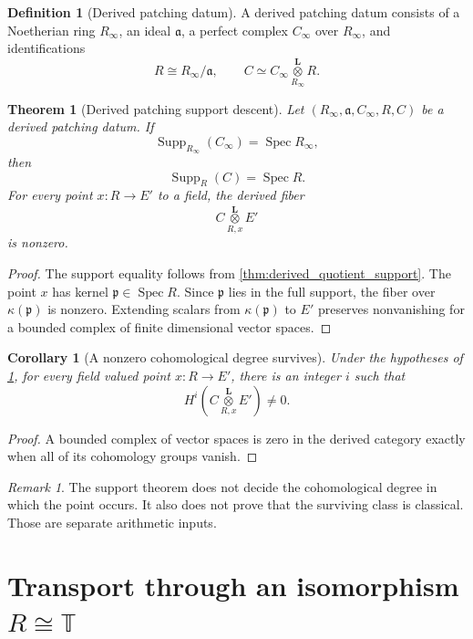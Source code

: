 \documentclass{aomart}
\newtheorem{theorem}{Theorem}[section]
\newtheorem{corollary}[corollary]{Corollary}
\theoremstyle{definition}
\newtheorem{definition}[definition]{Definition}
\theoremstyle{remark}
\newtheorem{remark}[remark]{Remark}
\newcommand{\TT}{\mathbb T}
\newcommand{\Spec}{\operatorname{Spec}}
\newcommand{\Supp}{\operatorname{Supp}}
\newcommand{\frakp}{\mathfrak p}
\newcommand{\fraka}{\mathfrak a}
\begin{document}
\begin{definition}[Derived patching datum]\label{def:derived_patching_datum}
A derived patching datum consists of a Noetherian ring \(R_\infty\), an ideal
\(\fraka\), a perfect complex \(C_\infty\) over \(R_\infty\), and identifications
\[
R\cong R_\infty/\fraka,
\qquad
C\simeq
C_\infty
\mathbin{\mathop{\otimes}\limits_{R_\infty}^{\mathbf L}}R.
\]
\end{definition}

\begin{theorem}[Derived patching support descent]\label{thm:derived_support_descent}
Let \((R_\infty,\fraka,C_\infty,R,C)\) be a derived patching datum. If
\[
\Supp_{R_\infty}(C_\infty)=\Spec R_\infty,
\]
then
\[
\boxed{
\Supp_R(C)=\Spec R.
}
\]
For every point \(x:R\to E'\) to a field, the derived fiber
\[
C\mathbin{\mathop{\otimes}\limits_{R,x}^{\mathbf L}}E'
\]
is nonzero.
\end{theorem}

\begin{proof}
The support equality follows from \cref{thm:derived_quotient_support}. The point
\(x\) has kernel \(\frakp\in\Spec R\). Since \(\frakp\) lies in the full support, the fiber over \(\kappa(\frakp)\) is nonzero. Extending scalars from \(\kappa(\frakp)\) to \(E'\) preserves nonvanishing for a bounded complex of finite dimensional vector spaces.
\end{proof}

\begin{corollary}[A nonzero cohomological degree survives]\label{cor:derived_degree_survives}
Under the hypotheses of \cref{thm:derived_support_descent}, for every field valued point \(x:R\to E'\), there is an integer \(i\) such that
\[
H^i
\left(
C\mathbin{\mathop{\otimes}\limits_{R,x}^{\mathbf L}}E'
\right)
\neq0.
\]
\end{corollary}

\begin{proof}
A bounded complex of vector spaces is zero in the derived category exactly when all of its cohomology groups vanish.
\end{proof}

\begin{remark}
The support theorem does not decide the cohomological degree in which the point occurs. It also does not prove that the surviving class is classical. Those are separate arithmetic inputs.
\end{remark}

\section{Transport through an isomorphism \texorpdfstring{\(R\cong\TT\)}{R equals T}}\label{sec:rt}
\end{document}
